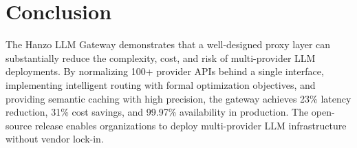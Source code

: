 \documentclass[11pt,twocolumn]{article}
\begin{document}
\section{Conclusion}
\label{sec:conclusion}

The Hanzo LLM Gateway demonstrates that a well-designed proxy layer can substantially reduce the complexity, cost, and risk of multi-provider LLM deployments. By normalizing 100+ provider APIs behind a single interface, implementing intelligent routing with formal optimization objectives, and providing semantic caching with high precision, the gateway achieves 23\% latency reduction, 31\% cost savings, and 99.97\% availability in production. The open-source release enables organizations to deploy multi-provider LLM infrastructure without vendor lock-in.


\end{document}
